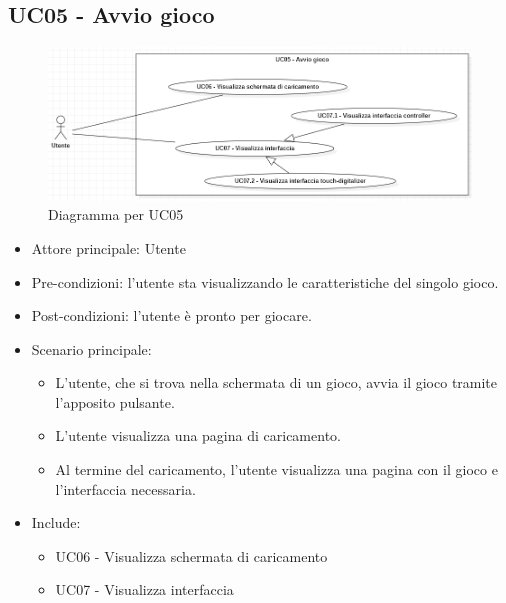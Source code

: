\subsection{UC05 - Avvio gioco}
\begin{figure}[h]
    \centering
    \includegraphics[width=400pt]{images/usecase/UC05.png}
    \caption{Diagramma per UC05}
    \label{fig:attore}
\end{figure}
\begin{itemize}
    \item Attore principale: Utente
    \item Pre-condizioni: l'utente sta visualizzando le caratteristiche del singolo gioco.
    \item Post-condizioni: l'utente è pronto per giocare.
    \item Scenario principale: \begin{itemize}
        \item L'utente, che si trova nella schermata di un gioco, avvia il gioco tramite l'apposito pulsante.
        \item L'utente visualizza una pagina di caricamento.
        \item Al termine del caricamento, l'utente visualizza una pagina con il gioco e l'interfaccia necessaria.
    \end{itemize}
    \item Include: \begin{itemize}
        \item UC06 - Visualizza schermata di caricamento
        \item UC07 - Visualizza interfaccia
    \end{itemize}
\end{itemize}

